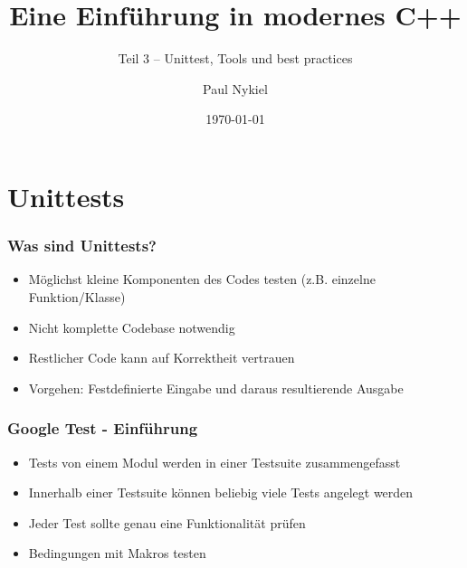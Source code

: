 \documentclass[aspectratio=169]{beamer}
\title{Eine Einführung in modernes C++}
\subtitle{Teil 3 -- Unittest, Tools und best practices}
\author{Paul Nykiel}
\date{\today}
\begin{document}
\maketitle


\section{Unittests}
\begin{frame}
    \frametitle{Was sind Unittests?}
    \begin{itemize}
        \item Möglichst kleine Komponenten des Codes testen (z.B. einzelne Funktion/Klasse)
            \pause
        \item Nicht komplette Codebase notwendig
            \pause
        \item Restlicher Code kann auf Korrektheit vertrauen
            \pause
        \item Vorgehen: Festdefinierte Eingabe und daraus resultierende Ausgabe
    \end{itemize}
\end{frame}

\begin{frame}
    \frametitle{Google Test - Einführung}
    \begin{itemize}
        \item Tests von einem Modul werden in einer Testsuite zusammengefasst
            \pause
        \item Innerhalb einer Testsuite können beliebig viele Tests angelegt werden
            \pause
        \item Jeder Test sollte genau eine Funktionalität prüfen
            \pause
        \item Bedingungen mit Makros testen
    \end{itemize}
\end{frame}
\end{document}
